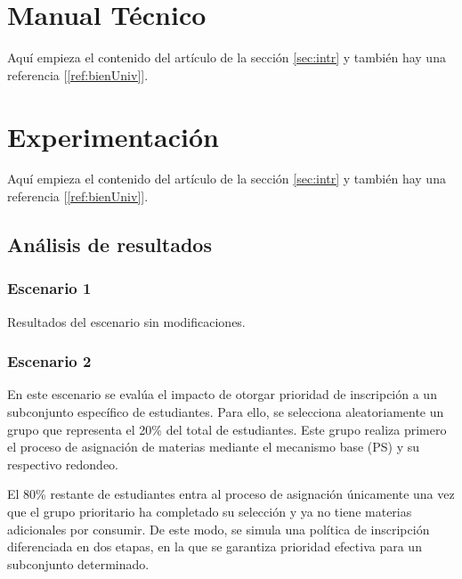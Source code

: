 \documentclass{article}
\begin{document}

\section{Manual Técnico}\label{sec:man_t}
Aquí empieza el contenido del artículo de la sección \ref{sec:intr} y también hay una referencia [\ref{ref:bienUniv}].



\section{Experimentación}\label{sec:exp}
Aquí empieza el contenido del artículo de la sección \ref{sec:intr} y también hay una referencia [\ref{ref:bienUniv}].

\subsection{Análisis de resultados}

\subsubsection{Escenario 1}

Resultados del escenario sin modificaciones.


\subsubsection{Escenario 2}

En este escenario se evalúa el impacto de otorgar prioridad de inscripción a un subconjunto 
específico de estudiantes. Para ello, se selecciona aleatoriamente un grupo que representa el 
20\% del total de estudiantes. Este grupo realiza primero el proceso de asignación de materias 
mediante el mecanismo base (PS) y su respectivo redondeo.

El 80\% restante de estudiantes entra al proceso de asignación únicamente una vez que el grupo 
prioritario ha completado su selección y ya no tiene materias adicionales por consumir. 
De este modo, se simula una política de inscripción diferenciada en dos etapas, en la que se 
garantiza prioridad efectiva para un subconjunto determinado.
\end{document}
